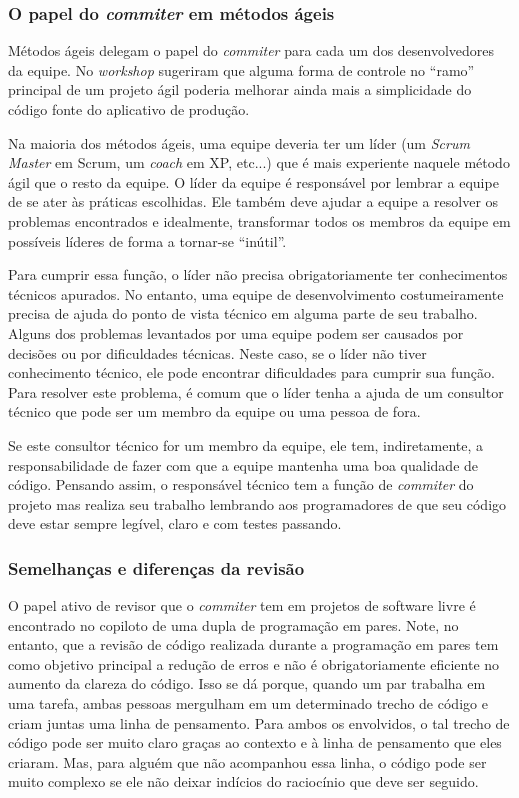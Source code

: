 \subsubsection{O papel do \emph{commiter} em métodos ágeis}

Métodos ágeis delegam o papel do \emph{commiter} para cada um dos
desenvolvedores da equipe. No \emph{workshop} sugeriram que alguma
forma de controle no ``ramo'' principal de um projeto ágil poderia
melhorar ainda mais a simplicidade do código fonte do aplicativo de
produção.

Na maioria dos métodos ágeis, uma equipe deveria ter um líder (um
\emph{Scrum Master} em Scrum, um \emph{coach} em XP, etc...)  que é
mais experiente naquele método ágil que o resto da equipe. O líder da
equipe é responsável por lembrar a equipe de se ater às práticas
escolhidas. Ele também deve ajudar a equipe a resolver os problemas
encontrados e idealmente, transformar todos os membros da equipe em
possíveis líderes de forma a tornar-se ``inútil''.

Para cumprir essa função, o líder não precisa obrigatoriamente ter
conhecimentos técnicos apurados. No entanto, uma equipe de
desenvolvimento costumeiramente precisa de ajuda do ponto de vista
técnico em alguma parte de seu trabalho. Alguns dos problemas
levantados por uma equipe podem ser causados por decisões ou por
dificuldades técnicas. Neste caso, se o líder não tiver conhecimento
técnico, ele pode encontrar dificuldades para cumprir sua função. Para
resolver este problema, é comum que o líder tenha a ajuda de um
consultor técnico que pode ser um membro da equipe ou uma pessoa de
fora.

Se este consultor técnico for um membro da equipe, ele tem,
indiretamente, a responsabilidade de fazer com que a equipe mantenha
uma boa qualidade de código. Pensando assim, o responsável técnico tem
a função de \emph{commiter} do projeto mas realiza seu trabalho
lembrando aos programadores de que seu código deve estar sempre
legível, claro e com testes passando.

\subsubsection{Semelhanças e diferenças da revisão}

O papel ativo de revisor que o \emph{commiter} tem em projetos de
software livre é encontrado no copiloto de uma dupla de programação em
pares. Note, no entanto, que a revisão de código realizada durante a
programação em pares tem como objetivo principal a redução de erros e
não é obrigatoriamente eficiente no aumento da clareza do código. Isso
se dá porque, quando um par trabalha em uma tarefa, ambas pessoas
mergulham em um determinado trecho de código e criam juntas uma linha
de pensamento. Para ambos os envolvidos, o tal trecho de código pode
ser muito claro graças ao contexto e à linha de pensamento que eles
criaram. Mas, para alguém que não acompanhou essa linha, o código pode
ser muito complexo se ele não deixar indícios do raciocínio que deve
ser seguido.

